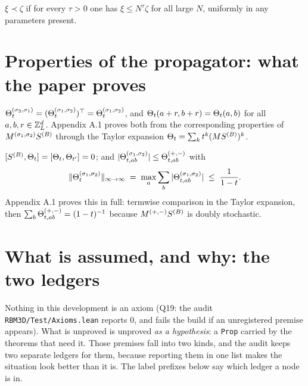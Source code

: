 \begin{definition}\label{def:prec}
  \leanok
  $\xi\prec\zeta$ if for every $\tau>0$ one has $\xi\le N^\tau\zeta$ for all large $N$,
  uniformly in any parameters present.
\end{definition}

\chapter{Properties of the propagator: what the paper proves}

\begin{lemma}\label{lem:propTH-12}
  \leanok
  $\Theta_t^{(\sigma_2,\sigma_1)}=(\Theta_t^{(\sigma_1,\sigma_2)})^\top=\Theta_t^{(\sigma_1,\sigma_2)}$,
  and $\Theta_t(a+r,b+r)=\Theta_t(a,b)$ for all $a,b,r\in\mathbb{Z}_L^d$.
  Appendix A.1 proves both from the corresponding properties of $M^{(\sigma_1,\sigma_2)}S^{(B)}$
  through the Taylor expansion $\Theta_t=\sum_k t^k(MS^{(B)})^k$.
\end{lemma}

\begin{lemma}\label{lem:propTH-34}
  \leanok
  $[S^{(B)},\Theta_t]=[\Theta_t,\Theta_{t'}]=0$; and $|\Theta_{t,ab}^{(\sigma_1,\sigma_2)}|\le\Theta_{t,ab}^{(+,-)}$
  with
  \[ \|\Theta_t^{(\sigma_1,\sigma_2)}\|_{\infty\to\infty}
     \;=\;\max_a\sum_b|\Theta_{t,ab}^{(\sigma_1,\sigma_2)}|\;\le\;\frac{1}{1-t}. \]
  Appendix A.1 proves this in full: termwise comparison in the Taylor expansion, then
  $\sum_b\Theta_{t,ab}^{(+,-)}=(1-t)^{-1}$ because $M^{(+,-)}S^{(B)}$ is doubly stochastic.
\end{lemma}

\chapter{What is assumed, and why: the two ledgers}

Nothing in this development is an axiom (Q19: the audit
\texttt{RBM3D/Test/Axioms.lean} reports 0, and fails the build if an unregistered premise
appears).  What is unproved is unproved \emph{as a hypothesis}: a \texttt{Prop} carried by
the theorems that need it.  Those premises fall into two kinds, and the audit keeps two
separate ledgers for them, because reporting them in one list makes the situation look
better than it is.  The label prefixes below say which ledger a node is in.

